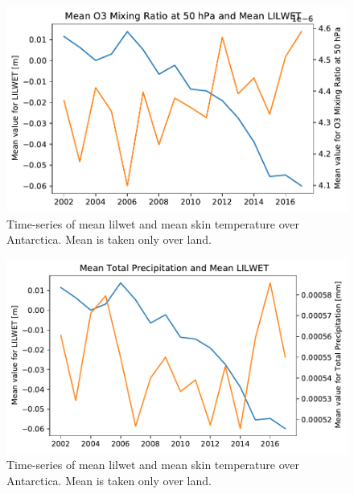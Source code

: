 \documentclass[../main.tex]{subfiles}
\begin{document}
\begin{figure}[!hbt]
    \centering
    \includegraphics{images/2021w5/chapter7/hres/tiemseries_o3_50}
    \caption{Time-series of mean \gls{lilwet} and mean skin temperature over Antarctica. Mean is taken only over land.}
    \label{fig:timeseries_o3_50}
\end{figure}
\begin{figure}[!hbt]
    \centering
    \includegraphics{images/2021w5/chapter7/hres/tiemseries_tp}
    \caption{Time-series of mean \gls{lilwet} and mean skin temperature over Antarctica. Mean is taken only over land.}
    \label{fig:timeseries_tp}
\end{figure}
\end{document}
